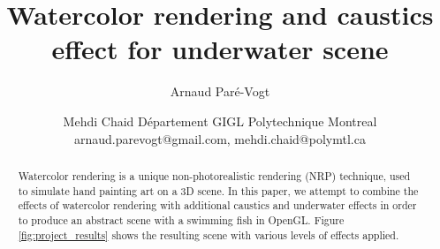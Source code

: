 \documentclass{article}
\title{Watercolor rendering and caustics effect for underwater scene} %
\author{
Arnaud Paré-Vogt
\and
Mehdi Chaid
\affiliations
Département GIGL Polytechnique Montreal\\
\emails
arnaud.parevogt@gmail.com, %
mehdi.chaid@polymtl.ca
}
\begin{document}
\lstset{language=C++}
\makeatletter
\g@addto@macro{}
\makeatother
\maketitle

\begin{abstract}
Watercolor rendering is a unique non-photorealistic rendering (NRP) technique, 
used to simulate hand painting art on a 3D scene. In this paper, we attempt to
combine the effects of watercolor rendering with additional caustics and underwater
effects in order to produce an abstract scene with a swimming fish in OpenGL. 
Figure \ref{fig:project_results} shows the resulting scene with various levels of effects applied.

\end{abstract}
\end{document}
